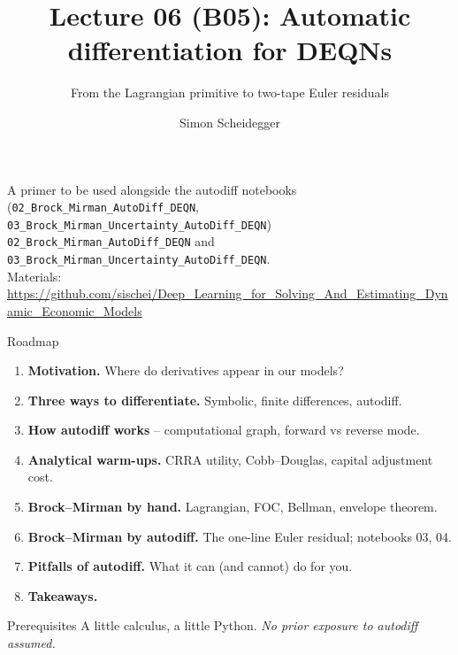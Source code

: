 \documentclass[aspectratio=169,11pt]{beamer}
\title[Lecture 06 (B05)]{Lecture 06 (B05): Automatic differentiation for DEQNs}
\subtitle{From the Lagrangian primitive to two-tape Euler residuals}
\author{Simon Scheidegger}
\institute{HEC, University of Lausanne}
\date{}
\begin{document}

{
\begin{frame}
\titlepage
\vspace{-0.4cm}
\begin{center}
{\footnotesize A primer to be used alongside the autodiff notebooks (\texttt{02\_Brock\_Mirman\_AutoDiff\_DEQN}, \texttt{03\_Brock\_Mirman\_Uncertainty\_AutoDiff\_DEQN})\\
\texttt{02\_Brock\_Mirman\_AutoDiff\_DEQN} and \texttt{03\_Brock\_Mirman\_Uncertainty\_AutoDiff\_DEQN}.}\\[4pt]
{\footnotesize Materials: \url{https://github.com/sischei/Deep_Learning_for_Solving_And_Estimating_Dynamic_Economic_Models}}
\end{center}
\end{frame}
}

\begin{frame}{Roadmap}
\begin{enumerate}\itemsep4pt
  \item \textbf{Motivation.} Where do derivatives appear in our models?
  \item \textbf{Three ways to differentiate.} Symbolic, finite differences, autodiff.
  \item \textbf{How autodiff works} -- computational graph, forward vs reverse mode.
  \item \textbf{Analytical warm-ups.} CRRA utility, Cobb--Douglas, capital adjustment cost.
  \item \textbf{Brock--Mirman by hand.} Lagrangian, FOC, Bellman, envelope theorem.
  \item \textbf{Brock--Mirman by autodiff.} The one-line Euler residual; notebooks 03, 04.
  \item \textbf{Pitfalls of autodiff.} What it can (and cannot) do for you.
  \item \textbf{Takeaways.}
\end{enumerate}
\vspace{6pt}
\begin{block}{Prerequisites}
\small
A little calculus, a little Python. \emph{No prior exposure to autodiff assumed.}
\end{block}
\end{frame}

\end{document}
